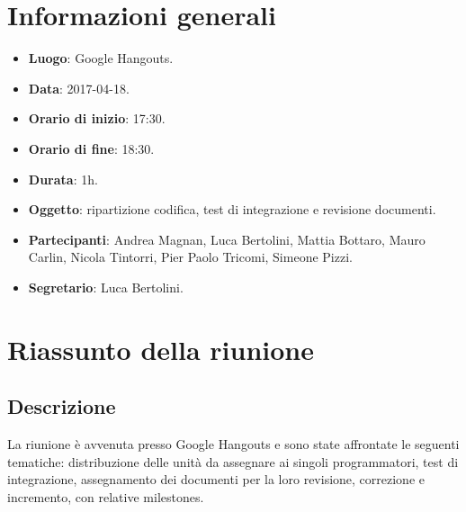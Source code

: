 \documentclass[a4paper,titlepage]{article}
\begin{document}
\maketitle
\begin{diario}
\end{diario}
\newpage
\tableofcontents

\newpage
\section{Informazioni generali}
\label{sec:Informazioni}

\begin{itemize}
  \item \textbf{Luogo}: Google Hangouts.
  \item \textbf{Data}: 2017-04-18.
  \item \textbf{Orario di inizio}: 17:30.
  \item \textbf{Orario di fine}: 18:30.
  \item \textbf{Durata}: 1h.
  \item \textbf{Oggetto}: ripartizione codifica, test di integrazione e revisione documenti.
  \item \textbf{Partecipanti}: Andrea Magnan, Luca Bertolini, Mattia Bottaro, Mauro Carlin, Nicola Tintorri, Pier Paolo Tricomi, Simeone Pizzi.
  \item \textbf{Segretario}: Luca Bertolini.

\end{itemize}
\section{Riassunto della riunione}
\label{sec:RiassuntoRiunione}
 \subsection{Descrizione}
La riunione è avvenuta presso Google Hangouts e sono state affrontate le seguenti tematiche: distribuzione delle unità da assegnare ai singoli programmatori, test di integrazione, assegnamento dei documenti per la loro revisione, correzione e incremento, con relative milestones.
\end{document}
